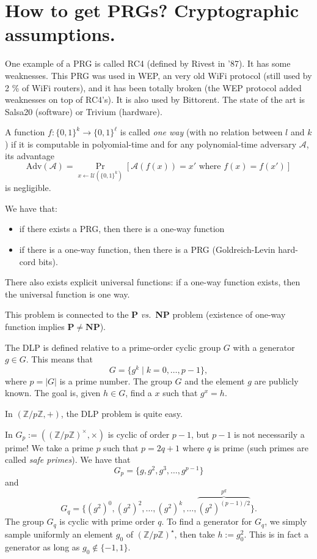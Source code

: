 \documentclass[./main]{subfiles}
\begin{document}
  \section{How to get PRGs? Cryptographic assumptions.}

  One example of a PRG is called RC4 (defined by Rivest in '87).
  It has some weaknesses.
  This PRG was used in WEP, an very old WiFi protocol (still used by 2 \% of WiFi routers), and it has been totally broken (the WEP protocol added weaknesses  on top of RC4's).
  It is also used by Bittorent.
  The state of the art is Salsa20 (software) or Trivium (hardware).

  \begin{defn}
    A function $f : \{0,1\}^k \to \{0,1\}^\ell$ is called \textit{one way} (with no relation between $l$ and $k$ ) if it is computable in polyomial-time and 
    for any polynomial-time adversary $\mathcal{A}$, its advantage \[
      \mathrm{Adv}(\mathcal{A}) = \Pr_{x \gets \mathcal{U}(\{0,1\}^k)}[\mathcal{A}(f(x)) = x' \text{ where } f(x) = f(x') ]
    \]
    is negligible.
  \end{defn}

  We have that:
  \begin{itemize}
    \item if there exists a PRG, then there is a one-way function
    \item if there is a one-way function, then there is a PRG (Goldreich-Levin hard-cord bits).
  \end{itemize}
  There also exists explicit universal functions: if a one-way function exists, then the universal function is one way.

  This problem is connected to the $\mathbf{P}$ \textit{vs.}\ \textbf{NP} problem (existence of one-way function implies $\mathbf{P} \neq \mathbf{NP}$).

  \begin{defn}
    The DLP is defined relative to a prime-order cyclic group $G$ with a generator~$g \in G$.
    This means that \[
    G = \{g^k  \mid k = 0, \ldots, p - 1\} 
    ,\] 
    where $p = |G|$ is a prime number. The group $G$ and the element $g$ are publicly known.
    The goal is, given $h \in G$, find a $x$ such that $g^x = h$.
  \end{defn}

  \begin{exm}
    In $(\mathds{Z} / p \mathds{Z}, +)$, the DLP problem is quite easy.

    In $G_p := ((\mathds{Z} / p \mathds{Z})^\times, \times)$ is cyclic of order $p-1$, but $p-1$ is not necessarily a prime!
    We take a prime $p$ such that $p = 2q + 1$ where $q$ is prime (such primes are called \textit{safe primes}).
    We have that 
    \[
      G_p = \{g, g^2, g^3, \ldots, g^{p-1}\}
    \] and \[G_q = \{(g^2)^0, (g^2)^2, \ldots, (g^2)^k, \ldots, \overbrace{(g^2)^{(p-1) / 2}}^{p^q}\} 
    .\] 
    The group $G_q$ is cyclic with prime order $q$. To find a generator for $G_q$, we simply sample uniformly an element $g_0$ of $(\mathds{Z} / p \mathds{Z})^\star$, then take $h := g_0^2$.
    This is in fact a generator as long as $g_0 \not\in \{-1, 1\}$.
  \end{exm}
\end{document}
